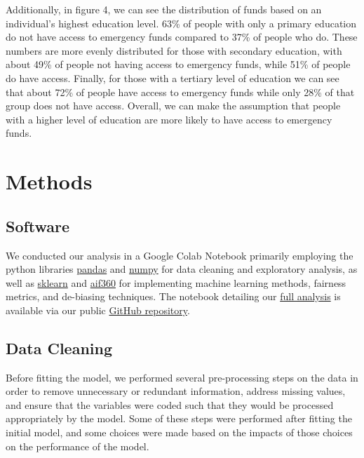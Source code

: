 \documentclass[water,article,submit,moreauthors,pdftex]{mdpi}
\begin{document}
Additionally, in figure 4, we can see the distribution of funds based on
an individual's highest education level. 63\% of people with only a
primary education do not have access to emergency funds compared to 37\%
of people who do. These numbers are more evenly distributed for those
with secondary education, with about 49\% of people not having access to
emergency funds, while 51\% of people do have access. Finally, for those
with a tertiary level of education we can see that about 72\% of people
have access to emergency funds while only 28\% of that group does not
have access. Overall, we can make the assumption that people with a
higher level of education are more likely to have access to emergency
funds.

\hypertarget{methods}{%
\section{Methods}\label{methods}}

\hypertarget{software}{%
\subsection{Software}\label{software}}

We conducted our analysis in a Google Colab Notebook primarily employing
the python libraries \href{https://pandas.pydata.org/}{pandas} and
\href{https://numpy.org/}{numpy} for data cleaning and exploratory
analysis, as well as \href{https://scikit-learn.org/stable/}{sklearn}
and \href{https://aif360.readthedocs.io/en/latest/}{aif360} for
implementing machine learning methods, fairness metrics, and de-biasing
techniques. The notebook detailing our
\href{https://github.com/sds-capstone/2022-09-proj7-women-at-table/blob/main/final_project.ipynb}{full
analysis} is available via our public
\href{https://github.com/sds-capstone/2022-09-proj7-women-at-table}{GitHub
repository}.

\hypertarget{data-cleaning}{%
\subsection{Data Cleaning}\label{data-cleaning}}

Before fitting the model, we performed several pre-processing steps on
the data in order to remove unnecessary or redundant information,
address missing values, and ensure that the variables were coded such
that they would be processed appropriately by the model. Some of these
steps were performed after fitting the initial model, and some choices
were made based on the impacts of those choices on the performance of
the model.
\end{document}
